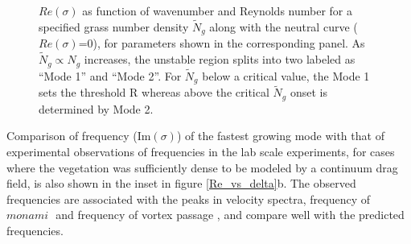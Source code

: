 \documentclass[aps,prl,twocolumn,superscriptaddress,10pt]{revtex4-1}  %
\newcommand{\Rey}{\text{R}}
\newcommand{\Ndg}{\tilde{N}_g}
\newcommand{\monami}{\textit{monami }}
\begin{document}
\begin{figure}
\begin{tabular}{cccc}
\end{tabular}
\caption{$Re(\sigma)$ as function of wavenumber and Reynolds number for a specified grass number density $\Ndg$ along with the neutral curve ($Re(\sigma)$=0), for parameters shown in the corresponding panel.  
As $\Ndg \propto N_g$ increases, the unstable region splits into two labeled as ``Mode 1'' and ``Mode 2''. 
For $\Ndg$ below a critical value, the Mode 1 sets the threshold $\Rey$ whereas above the critical $\Ndg$ onset is determined by Mode 2.}
\label{K_Re_sigma_set3}
\end{figure}

Comparison of frequency (Im$(\sigma)$) of the fastest growing mode with that of experimental observations of frequencies in
the lab scale experiments, for cases where the vegetation was sufficiently dense to be modeled by a continuum drag field, is also shown in the inset in figure \ref{Re_vs_delta}b. 
The observed frequencies are associated with the peaks in velocity spectra, frequency of $\monami$ and frequency of 
vortex passage \cite{Ghisal02}, and compare well with the predicted frequencies. 
\end{document}
